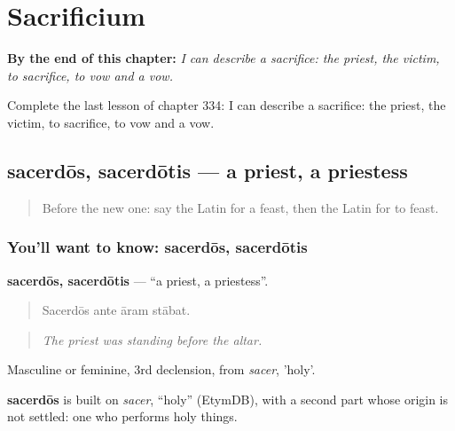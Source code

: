 
\chapter{Sacrificium}
\label{ch:la-sacrificium}

\begin{chapteropening}
\textbf{By the end of this chapter:} \emph{I can describe a sacrifice: the priest, the victim, to sacrifice, to vow and a vow.}

Complete the last lesson of chapter 334: I can describe a sacrifice: the priest, the victim, to sacrifice, to vow and a vow.
\end{chapteropening}

\section[sacerdōs, sacerdōtis]{sacerdōs, sacerdōtis — a priest, a priestess}

\label{lesson:LA-C334-sacerdos}



\begin{quote}
Before the new one: say the Latin for a feast, then the Latin for to feast.
\end{quote}

\subsection*{You'll want to know: sacerdōs, sacerdōtis}
\textbf{sacerdōs, sacerdōtis} — \textquotedblleft{}a priest, a priestess\textquotedblright{}.

\begin{quote}
Sacerdōs ante āram stābat.
\end{quote}

\begin{quote}
\emph{The priest was standing before the altar.}
\end{quote}

Masculine or feminine, 3rd declension, from \emph{sacer}, 'holy'.

\begin{cousinweb}
\textbf{sacerdōs} is built on \emph{sacer}, \textquotedblleft{}holy\textquotedblright{} (EtymDB), with a second part whose origin is not settled: one who performs holy things.
\end{cousinweb}

